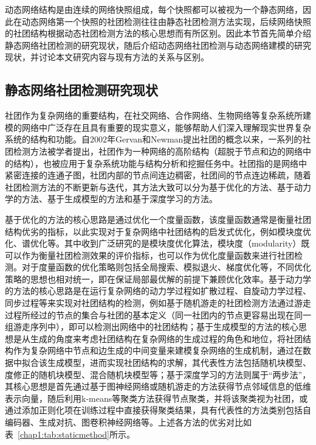 动态网络结构是由连续的网络快照组成，每个快照都可以被视为一个静态网络，因此在动态网络第一个快照的社团检测往往由静态社团检测方法实现，后续网络快照的社团结构根据动态社团检测方法的核心思想而有所区别。因此本节首先简单介绍静态网络社团检测的研究现状，随后介绍动态网络社团检测与动态网络建模的研究现状，并讨论本文研究内容与现有方法的关系与区别。
\subsection{静态网络社团检测研究现状}
社团作为复杂网络的重要结构，在社交网络、合作网络、生物网络等复杂系统所建模的网络中广泛存在且具有重要的现实意义，能够帮助人们深入理解现实世界复杂系统的结构和功能。自$2002$年Gervan和Newman提出社团的概念以来\cite{girvan2002community}，一系列的社团检测方法被学者提出，社团作为一种网络的高阶结构（超脱于节点和边的网络中的结构），也被应用于复杂系统功能与结构分析和挖掘任务中。社团指的是网络中紧密连接的连通子图，社团内部的节点间连边稠密，社团间的节点连边稀疏，随着社团检测方法的不断更新与迭代，其方法大致可以分为基于优化的方法、基于动力学的方法、基于生成模型的方法和基于深度学习的方法\cite{fortunato2016community,jin2021survey}。

基于优化的方法的核心思路是通过优化一个度量函数，该度量函数通常是衡量社团结构优劣的指标，以此实现对于复杂网络中社团结构的启发式优化，例如模块度优化、谱优化等。其中收到广泛研究的是模块度优化算法\cite{zhang2009modularity}，模块度（modularity）既可以作为衡量社团检测效果的评价指标，也可以作为优化度量函数来进行社团检测。对于度量函数的优化策略则包括全局搜索、模拟退火、梯度优化等\cite{zhang2014scalable,lee2012modularity,JSJA20241121007}，不同优化策略的思想也相对统一，即在保证局部最优解的前提下兼顾优化效率。基于动力学的方法的核心思路是在运行复杂网络的动力学过程如扩散过程\cite{jeub2015think}、自旋动力学过程\cite{traag2011narrow}、同步过程\cite{boccaletti2007detecting}等来实现对社团结构的检测，例如基于随机游走的社团检测方法\cite{pons2006computing,JSJA201912008}通过游走过程所经过的节点的集合与社团的基本定义（同一社团内的节点更容易出现在同一组游走序列中），即可以检测出网络中的社团结构；基于生成模型的方法的核心思想是从生成的角度来考虑社团结构在复杂网络的生成过程的角色和地位，将社团结构作为复杂网络中节点和边生成的中间变量来建模复杂网络的生成机制，通过在数据中拟合该生成模型，进而实现社团结构的求解，其代表性方法包括随机块模型\cite{snijders1997estimation}、度修正的随机块模型\cite{karrer2011stochastic}、混合随机块模型\cite{zhang2020struct}等；基于深度学习的方法则属于“两步法”，其核心思想是首先通过基于图神经网络或随机游走的方法获得节点邻域信息的低维表示向量，随后利用k-means等聚类方法获得节点聚类，并将该聚类视为社团，或通过添加正则化项在训练过程中直接获得聚类结果，具有代表性的方法类别包括自编码器\cite{sun2020network}、生成对抗\cite{zhang2020seal}、图卷积神经网络\cite{he2021community}等。上述各方法的优劣对比如表~\ref{chap1:tab:staticmethod}所示。

